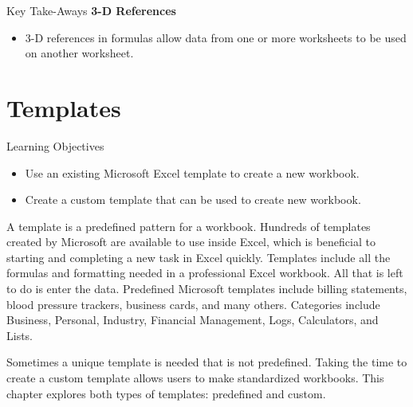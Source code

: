\begin{center}
	\begin{tkwbox}{Key Take-Aways}
		\textbf{3-D References}
		\\
		\begin{itemize}
			\setlength{\itemsep}{0pt}
			\setlength{\parskip}{0pt}
			\setlength{\parsep}{0pt}
			
			\item $ 3 $-D references in formulas allow data from one or more worksheets to be used on another worksheet.
			
		\end{itemize}
	\end{tkwbox}
\end{center}

\section{Templates}

\begin{center}
	\begin{objbox}{Learning Objectives}
		\begin{itemize}
			\setlength{\itemsep}{0pt}
			\setlength{\parskip}{0pt}
			\setlength{\parsep}{0pt}

			\item Use an existing Microsoft Excel template to create a new workbook.
			\item Create a custom template that can be used to create new workbook.
		
		\end{itemize}
	\end{objbox}
\end{center}

A template is a predefined pattern for a workbook. Hundreds of templates created by Microsoft are available to use inside Excel, which is beneficial to starting and completing a new task in Excel quickly. Templates include all the formulas and formatting needed in a professional Excel workbook. All that is left to do is enter the data. Predefined Microsoft templates include billing statements, blood pressure trackers, business cards, and many others. Categories include Business, Personal, Industry, Financial Management, Logs, Calculators, and Lists.

Sometimes a unique template is needed that is not predefined. Taking the time to create a custom template allows users to make standardized workbooks. This chapter explores both types of templates: predefined and custom.

